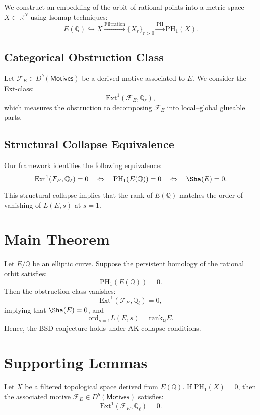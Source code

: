 We construct an embedding of the orbit of rational points into a metric space \( X \subset \mathbb{R}^N \) using Isomap techniques:
\[
E(\mathbb{Q}) \hookrightarrow X \xrightarrow{\mathrm{Filtration}} \{ X_r \}_{r > 0} \xrightarrow{\mathrm{PH}} \mathrm{PH}_1(X).
\]

\subsection{Categorical Obstruction Class}

Let \( \mathcal{F}_E \in D^b(\mathsf{Motives}) \) be a derived motive associated to \( E \).  
We consider the Ext-class:
\[
\mathrm{Ext}^1(\mathcal{F}_E, \mathbb{Q}_\ell),
\]
which measures the obstruction to decomposing \( \mathcal{F}_E \) into local–global glueable parts.

\subsection{Structural Collapse Equivalence}

Our framework identifies the following equivalence:
\[
\mathrm{Ext}^1(\mathcal{F}_E, \mathbb{Q}_\ell) = 0 \quad \Leftrightarrow \quad \mathrm{PH}_1(E(\mathbb{Q})) = 0 \quad \Leftrightarrow \quad \Sha(E) = 0.
\]

This structural collapse implies that the rank of \( E(\mathbb{Q}) \) matches the order of vanishing of \( L(E,s) \) at \( s=1 \).


\section{Main Theorem}

\begin{theorem}
Let \( E/\mathbb{Q} \) be an elliptic curve.  
Suppose the persistent homology of the rational orbit satisfies:
\[
\mathrm{PH}_1(E(\mathbb{Q})) = 0.
\]
Then the obstruction class vanishes:
\[
\mathrm{Ext}^1(\mathcal{F}_E, \mathbb{Q}_\ell) = 0,
\]
implying that \( \Sha(E) = 0 \), and
\[
\mathrm{ord}_{s=1}L(E,s) = \mathrm{rank}_\mathbb{Q}E.
\]
Hence, the BSD conjecture holds under AK collapse conditions.
\end{theorem}

\section{Supporting Lemmas}

\begin{lemma}
Let \( X \) be a filtered topological space derived from \( E(\mathbb{Q}) \).  
If \( \mathrm{PH}_1(X) = 0 \), then the associated motive \( \mathcal{F}_E \in D^b(\mathsf{Motives}) \) satisfies:
\[
\mathrm{Ext}^1(\mathcal{F}_E, \mathbb{Q}_\ell) = 0.
\]
\end{lemma}

